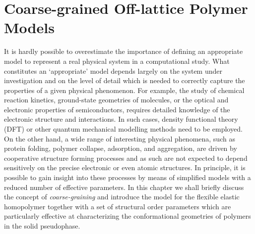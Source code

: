 \documentclass[12pt]{report}
\begin{document}

\chapter{Coarse-grained Off-lattice Polymer Models}
\label{chap:HomopolymerModel}
It is hardly possible to overestimate the importance of defining an appropriate model to represent a real physical system in a computational study. What constitutes an `appropriate' model depends largely on the system under investigation and on the level of detail which is needed to correctly capture the properties of a given physical phenomenon. For example, the study of chemical reaction kinetics, ground-state geometries of molecules, or the optical and electronic properties of semiconductors, requires detailed knowledge of the electronic structure and interactions. In such cases, density functional theory (DFT)\cite{Sholl2009} or other quantum mechanical modelling methods need to be employed. On the other hand, a wide range of interesting physical phenomena, such as protein folding, polymer collapse, adsorption, and aggregation, are driven by cooperative structure forming processes and as such are not expected to depend sensitively on the precise electronic or even atomic structures. In principle, it is possible to gain insight into these processes by means of simplified models with a reduced number of effective parameters\cite{Bachmann2014,Schmid2011}. In this chapter we shall briefly discuss the concept of \textit{coarse-graining} and introduce the model for the flexible elastic homopolymer together with a set of structural order parameters which are particularly effective at characterizing the conformational geometries of polymers in the solid pseudophase.


\end{document}
